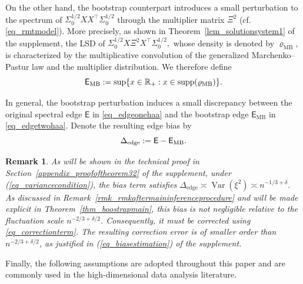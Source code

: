 \documentclass[12pt]{article}
\theoremstyle{plain}
\newtheorem{remark}{Remark}[section]
\numberwithin{equation}{section}
\begin{document}
On the other hand, the bootstrap counterpart introduces a small perturbation to the spectrum of $\Sigma_0^{1/2}XX^\top\Sigma_0^{1/2}$ through the multiplier matrix $\Xi^2$ (cf. \eqref{eq_rmtmodel}). More precisely, as shown in Theorem~\ref{lem_solutionsystem1} of the supplement, the LSD of $\Sigma_0^{1/2}X \Xi^2 X^{\top}\Sigma_0^{1/2},$ whose density is denoted by $\varrho_{\mathrm{MB}}$, is characterized by the multiplicative convolution of the generalized Marchenko--Pastur law and the multiplier distribution. We therefore define \vspace*{-10pt}
\begin{equation}\label{eq_edgetwohaa}
	\vspace*{-10pt}
	\mathsf{E}_{\mathrm{MB}}
	:=
	\sup\{x\in\mathbb{R}_+ : x\in \operatorname{supp}(\varrho_{\mathrm{MB}})\}.
\end{equation}

In general, the bootstrap perturbation induces a small discrepancy between the original spectral edge $\mathsf E$ in \eqref{eq_edgeonehaa} and the bootstrap edge $\mathsf{E}_{\mathrm{MB}}$ in \eqref{eq_edgetwohaa}. Denote the resulting edge bias by \vspace*{-10pt}
\begin{equation}\label{eq_bias}
	\vspace*{-10pt}
	\Delta_{\mathrm{edge}}
	:=
	\mathsf E-\mathsf E_{\mathrm{MB}}.
\end{equation}

\begin{remark}\label{eq_biastermrmk}
	As will be shown in the technical proof in Section~\ref{appendix_proofoftheorem32} of the supplement, under (\ref{eq_variancecondition}), the bias term satisfies $\Delta_{\mathrm{edge}} \asymp \operatorname{Var}(\xi^2) \asymp n^{-1/3+\delta}.$ As discussed in Remark~\ref{rmk_rmkaftermaininferenceprocedure} and will be made explicit in Theorem~\ref{thm_boostrapmain}, this bias is not negligible relative to the fluctuation scale $n^{-2/3+\delta/2}$. Consequently, it must be corrected using \eqref{eq_correctionterm}. The resulting correction error is of smaller order than $n^{-2/3+\delta/2}$, as justified in (\ref{eq_biasestimation}) of the supplement. 
\end{remark}


Finally, the following assumptions are adopted throughout this paper and are commonly used in the high-dimensional data analysis literature. 
\end{document}
